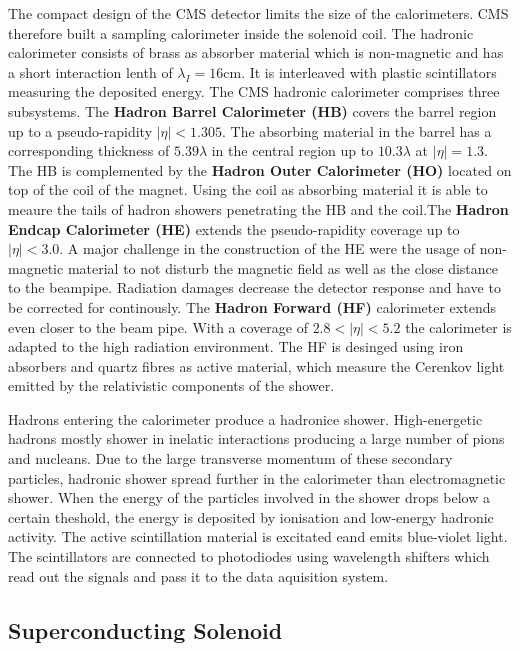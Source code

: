The compact design of the CMS detector limits the size of the calorimeters. CMS
therefore built a sampling calorimeter inside the solenoid coil. The hadronic
calorimeter consists of brass as absorber material which is non-magnetic and
has a short interaction lenth of $\lambda_I = 16 \si{\centi\metre}$. It is
interleaved with plastic scintillators measuring the deposited energy. The CMS
hadronic calorimeter comprises three subsystems. The \textbf{Hadron Barrel
Calorimeter (HB)} covers the barrel region up to a pseudo-rapidity $|\eta| <
1.305$. The absorbing material in the barrel has a corresponding thickness of
$5.39 \lambda$ in the central region up to $10.3 \lambda$ at $|\eta| = 1.3$. The
HB is complemented by the \textbf{Hadron Outer Calorimeter (HO)} located on top
of the coil of the magnet. Using the coil as absorbing material it is able to
meaure the tails of hadron showers penetrating the HB and the coil.The
\textbf{Hadron Endcap Calorimeter (HE)} extends the pseudo-rapidity coverage up
to $|\eta| < 3.0$. A major challenge in the construction of the HE were the
usage of non-magnetic material to not disturb the magnetic field as well as the
close distance to the beampipe. Radiation damages decrease the detector response
and have to be corrected for continously. The \textbf{Hadron Forward (HF)}
calorimeter extends even closer to the beam pipe. With a coverage of $2.8 <
|\eta| < 5.2$ the calorimeter is adapted to the high radiation environment. The
HF is desinged using iron absorbers and quartz fibres as active material, which
measure the Cerenkov light emitted by the relativistic components of the
shower.

Hadrons entering the calorimeter produce a hadronice shower. High-energetic
hadrons mostly shower in inelatic interactions producing a large number of pions
and nucleans. Due to the large transverse momentum of these secondary particles,
hadronic shower spread further in the calorimeter than electromagnetic shower.
When the energy of the particles involved in the shower drops below a certain
theshold, the energy is deposited by ionisation and low-energy hadronic
activity. The active scintillation material is excitated eand emits blue-violet
light. The scintillators are connected to photodiodes using wavelength
shifters which read out the signals and pass it to the data aquisition system.

\subsection{Superconducting Solenoid}

